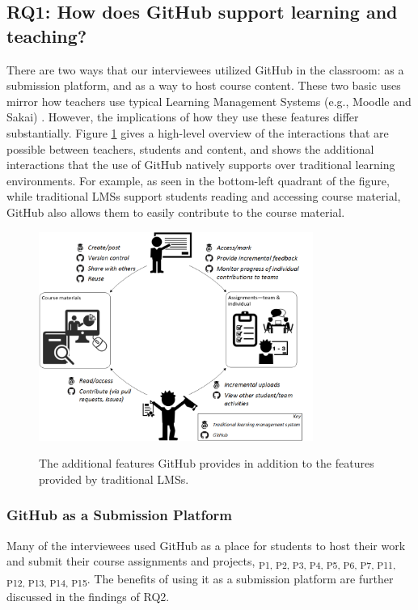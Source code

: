 \subsection{RQ1: How does GitHub support learning and teaching?}
There are two ways that our interviewees utilized GitHub in the classroom: as a submission platform, and as a way to host course content. These two basic uses mirror how teachers use typical Learning Management Systems (e.g., Moodle and Sakai) \cite{malikowski2007model}. However, the implications of how they use these features differ substantially. Figure \ref{fig:edu_workflow} gives a high-level overview of the interactions that are possible between teachers, students and content, and shows the additional interactions that the use of GitHub natively supports over traditional learning environments. For example, as seen in the bottom-left quadrant of the figure, while traditional LMSs support students reading and accessing course material, GitHub also allows them to easily contribute to the course material.

\begin{figure}[h!]
 \caption{The additional features GitHub provides in addition to the features provided by traditional LMSs.}
 \centering
   \includegraphics[width=0.8\textwidth]{EduWorkflowLargeType}
 \label{fig:edu_workflow}
\end{figure}

\subsubsection{GitHub as a Submission Platform}
Many of the interviewees used GitHub as a place for students to host their work and submit their course assignments and projects, \textsubscript{P1, P2, P3, P4, P5, P6, P7, P11, P12, P13, P14, P15}. The benefits of using it as a submission platform are further discussed in the findings of RQ2.

